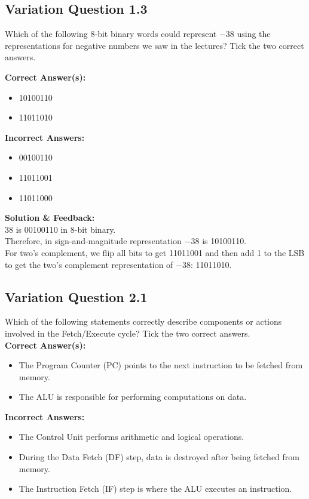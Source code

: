 \subsection{Variation Question 1.3}
Which of the following 8-bit binary words could represent $-38$ using the representations for negative numbers we saw in the lectures?
Tick the two correct answers.

\textbf{Correct Answer(s):}
\begin{itemize}
    \item 10100110
    \item 11011010
\end{itemize}
\textbf{Incorrect Answers:}
\begin{itemize}
    \item 00100110
    \item 11011001
    \item 11011000
\end{itemize}
\textbf{Solution \& Feedback:}\\
38 is 00100110 in 8-bit binary.\\
Therefore, in sign-and-magnitude representation $-38$ is 10100110.\\
For two’s complement, we flip all bits to get 11011001 and then add 1 to the LSB to get the two’s complement representation of $-38$: 11011010.

\subsection{Variation Question 2.1}
Which of the following statements correctly describe components or actions involved in the Fetch/Execute cycle?
Tick the two correct answers.\\
\textbf{Correct Answer(s):}
\begin{itemize}
    \item The Program Counter (PC) points to the next instruction to be fetched from memory.
    \item The ALU is responsible for performing computations on data.
\end{itemize}

\textbf{Incorrect Answers:}
\begin{itemize}
    \item The Control Unit performs arithmetic and logical operations.
    \item During the Data Fetch (DF) step, data is destroyed after being fetched from memory.
    \item The Instruction Fetch (IF) step is where the ALU executes an instruction.
\end{itemize}


